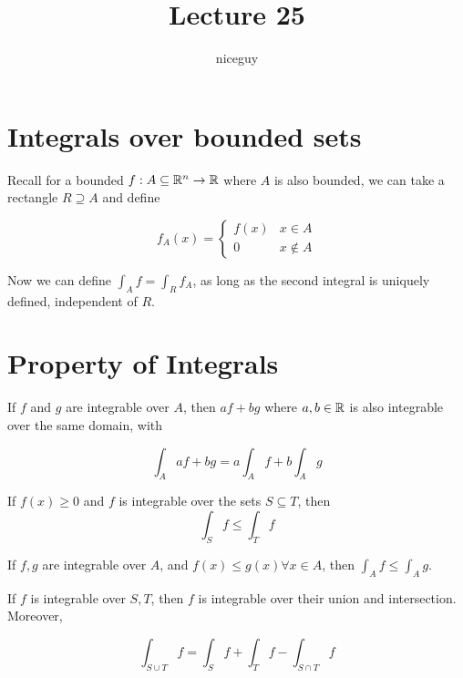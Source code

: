 \documentclass[12pt]{article}
\title{Lecture 25}
\author{niceguy}
\begin{document}
\maketitle

\section{Integrals over bounded sets}

Recall for a bounded $f: A \subseteq \mathbb{R}^n \rightarrow \mathbb{R}$ where $A$ is also bounded, we can take a rectangle $R \supseteq A$ and define

$$f_A(x) = \begin{cases} f(x) & x \in A \\ 0 & x \notin A\end{cases}$$

Now we can define $\int_Af = \int_R f_A$, as long as the second integral is uniquely defined, independent of $R$.

\section{Property of Integrals}

If $f$ and $g$ are integrable over $A$, then $af + bg$ where $a,b \in \mathbb{R}$ is also integrable over the same domain, with

$$\int_A af + bg = a\int_A f + b \int_A g$$

If $f(x) \geq 0$ and $f$ is integrable over the sets $S \subseteq T$, then
$$\int_S f \leq \int_T f$$

If $f,g$ are integrable over $A$, and $f(x) \leq g(x) \forall x \in A$, then $\int_A f \leq \int_A g$.

If $f$ is integrable over $S,T$, then $f$ is integrable over their union and intersection. Moreover,

$$\int_{S\cup T} f = \int_S f + \int_T f - \int_{S\cap T} f$$
\end{document}
